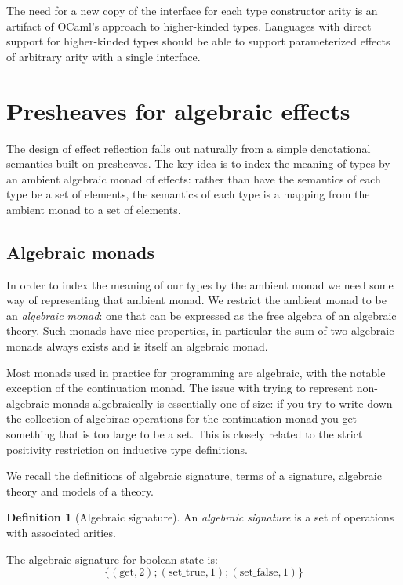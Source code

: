 \documentclass[acmsmall, screen, nonacm]{acmart}
\theoremstyle{definition}
\newtheorem{definition}{Definition}[section]
\begin{document}
The need for a new copy of the interface for each type constructor arity
is an artifact of OCaml's approach to higher-kinded types. Languages
with direct support for higher-kinded types should be able to support
parameterized effects of arbitrary arity with a single interface.

\section{Presheaves for algebraic effects}
\label{sec:semantics}

The design of effect reflection falls out naturally from a simple
denotational semantics built on presheaves. The key idea is to index the
meaning of types by an ambient algebraic monad of effects: rather than
have the semantics of each type be a set of elements, the semantics of
each type is a mapping from the ambient monad to a set of elements.

\subsection{Algebraic monads}

In order to index the meaning of our types by the ambient monad we need
some way of representing that ambient monad. We restrict the ambient
monad to be an \emph{algebraic monad}: one that can be expressed as the
free algebra of an algebraic theory. Such monads have nice properties,
in particular the sum of two algebraic monads always exists and is
itself an algebraic monad.

Most monads used in practice for programming are algebraic, with the
notable exception of the continuation monad. The issue with trying to
represent non-algebraic monads algebraically is essentially one of size:
if you try to write down the collection of algebirac operations for the
continuation monad you get something that is too large to be a set. This
is closely related to the strict positivity restriction on inductive
type definitions.

We recall the definitions of algebraic signature, terms of a signature,
algebraic theory and models of a theory.
\begin{definition}[Algebraic signature]
  An \emph{algebraic signature} is a set of operations with associated
  arities.
\end{definition}

\begin{example}
  The algebraic signature for boolean state is:
  \begin{equation*}
    \{ (\mathrm{get}, 2); (\mathrm{set\_true}, 1); (\mathrm{set\_false}, 1) \}
  \end{equation*}
\end{example}
\end{document}
